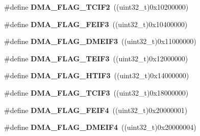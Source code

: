\begin{DoxyCompactItemize}
\item 
\hypertarget{group___d_m_a__flags__definition_ga26c60c0cd9f24112eb082c7bbba1eff7}{\#define {\bfseries D\-M\-A\-\_\-\-F\-L\-A\-G\-\_\-\-T\-C\-I\-F2}~((uint32\-\_\-t)0x10200000)}\label{group___d_m_a__flags__definition_ga26c60c0cd9f24112eb082c7bbba1eff7}

\item 
\hypertarget{group___d_m_a__flags__definition_ga7d551a54c46071ea3629d38768cd8638}{\#define {\bfseries D\-M\-A\-\_\-\-F\-L\-A\-G\-\_\-\-F\-E\-I\-F3}~((uint32\-\_\-t)0x10400000)}\label{group___d_m_a__flags__definition_ga7d551a54c46071ea3629d38768cd8638}

\item 
\hypertarget{group___d_m_a__flags__definition_gacb835761b58d15662b0e631697bbf0a4}{\#define {\bfseries D\-M\-A\-\_\-\-F\-L\-A\-G\-\_\-\-D\-M\-E\-I\-F3}~((uint32\-\_\-t)0x11000000)}\label{group___d_m_a__flags__definition_gacb835761b58d15662b0e631697bbf0a4}

\item 
\hypertarget{group___d_m_a__flags__definition_ga36854c526eb41566bcf1c4505265433c}{\#define {\bfseries D\-M\-A\-\_\-\-F\-L\-A\-G\-\_\-\-T\-E\-I\-F3}~((uint32\-\_\-t)0x12000000)}\label{group___d_m_a__flags__definition_ga36854c526eb41566bcf1c4505265433c}

\item 
\hypertarget{group___d_m_a__flags__definition_ga10e669df50c5a5fe93b698f75f0574d6}{\#define {\bfseries D\-M\-A\-\_\-\-F\-L\-A\-G\-\_\-\-H\-T\-I\-F3}~((uint32\-\_\-t)0x14000000)}\label{group___d_m_a__flags__definition_ga10e669df50c5a5fe93b698f75f0574d6}

\item 
\hypertarget{group___d_m_a__flags__definition_gae8dde773a36a6d211d718bace2438def}{\#define {\bfseries D\-M\-A\-\_\-\-F\-L\-A\-G\-\_\-\-T\-C\-I\-F3}~((uint32\-\_\-t)0x18000000)}\label{group___d_m_a__flags__definition_gae8dde773a36a6d211d718bace2438def}

\item 
\hypertarget{group___d_m_a__flags__definition_ga81f626454f81551dffa17619f459b99b}{\#define {\bfseries D\-M\-A\-\_\-\-F\-L\-A\-G\-\_\-\-F\-E\-I\-F4}~((uint32\-\_\-t)0x20000001)}\label{group___d_m_a__flags__definition_ga81f626454f81551dffa17619f459b99b}

\item 
\hypertarget{group___d_m_a__flags__definition_gae47ce0553cd8c561d0c5a903accf3411}{\#define {\bfseries D\-M\-A\-\_\-\-F\-L\-A\-G\-\_\-\-D\-M\-E\-I\-F4}~((uint32\-\_\-t)0x20000004)}\label{group___d_m_a__flags__definition_gae47ce0553cd8c561d0c5a903accf3411}


\end{DoxyCompactItemize}
